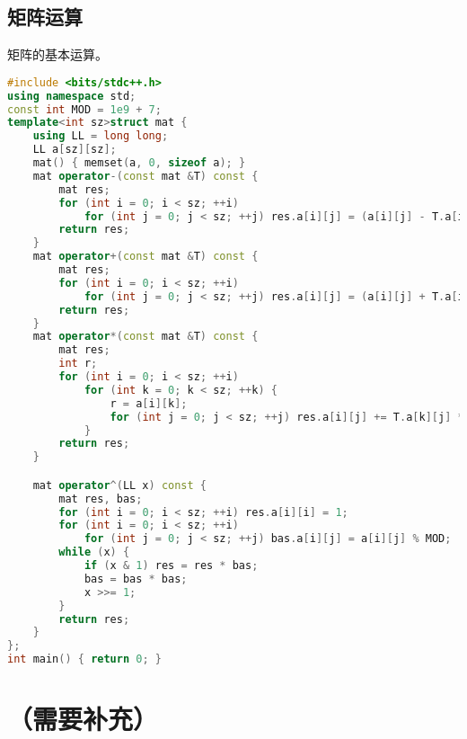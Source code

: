 \documentclass[9pt, a4paper, oneside]{book}
\begin{document}
\subsection{矩阵运算}
矩阵的基本运算。
\begin{lstlisting}[language={C++}]
#include <bits/stdc++.h>
using namespace std;
const int MOD = 1e9 + 7;
template<int sz>struct mat {
    using LL = long long;
    LL a[sz][sz];
    mat() { memset(a, 0, sizeof a); }
    mat operator-(const mat &T) const {
        mat res;
        for (int i = 0; i < sz; ++i)
            for (int j = 0; j < sz; ++j) res.a[i][j] = (a[i][j] - T.a[i][j]) % MOD;
        return res;
    }
    mat operator+(const mat &T) const {
        mat res;
        for (int i = 0; i < sz; ++i)
            for (int j = 0; j < sz; ++j) res.a[i][j] = (a[i][j] + T.a[i][j]) % MOD;
        return res;
    }
    mat operator*(const mat &T) const {
        mat res;
        int r;
        for (int i = 0; i < sz; ++i)
            for (int k = 0; k < sz; ++k) {
                r = a[i][k];
                for (int j = 0; j < sz; ++j) res.a[i][j] += T.a[k][j] * r, res.a[i][j] %= MOD;
            }
        return res;
    }

    mat operator^(LL x) const {
        mat res, bas;
        for (int i = 0; i < sz; ++i) res.a[i][i] = 1;
        for (int i = 0; i < sz; ++i)
            for (int j = 0; j < sz; ++j) bas.a[i][j] = a[i][j] % MOD;
        while (x) {
            if (x & 1) res = res * bas;
            bas = bas * bas;
            x >>= 1;
        }
        return res;
    }
};
int main() { return 0; }\end{lstlisting}
\section{（需要补充）}
\end{document}
